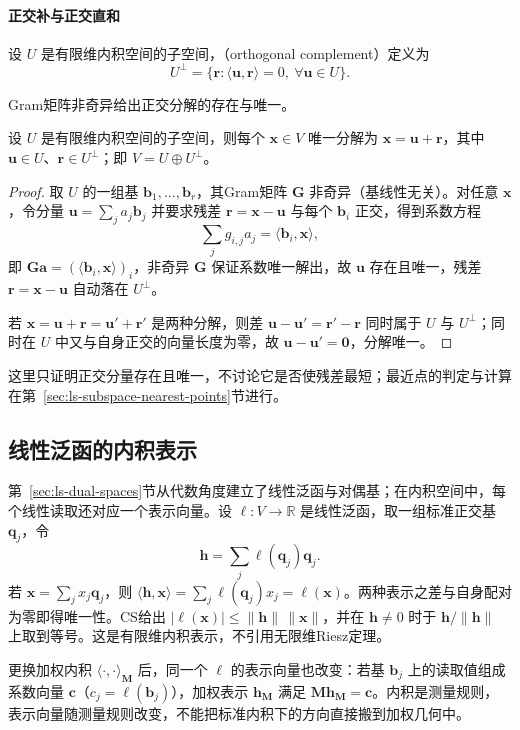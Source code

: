 \paragraph{正交补与正交直和}

设 $U$ 是有限维内积空间的子空间，（orthogonal complement）定义为
\[
 U^\perp=\{\bm r:\langle\bm u,\bm r\rangle=0,\ \forall\bm u\in U\}.
\]

Gram矩阵非奇异给出正交分解的存在与唯一。
\begin{lemma}[正交直和]
\label{lem:ls-orthogonal-decomposition}
设 $U$ 是有限维内积空间的子空间，则每个 $\bm x\in V$ 唯一分解为 $\bm x=\bm u+\bm r$，其中 $\bm u\in U$、$\bm r\in U^\perp$；即 $V=U\oplus U^\perp$。
\end{lemma}
\begin{proof}
取 $U$ 的一组基 $\bm b_1,\ldots,\bm b_r$，其Gram矩阵 $\bm G$ 非奇异（基线性无关）。对任意 $\bm x$，令分量 $\bm u=\sum_j a_j\bm b_j$ 并要求残差 $\bm r=\bm x-\bm u$ 与每个 $\bm b_i$ 正交，得到系数方程
\[
 \sum_j g_{i,j}a_j=\langle\bm b_i,\bm x\rangle,
\]
即 $\bm G\bm a=(\langle\bm b_i,\bm x\rangle)_i$，非奇异 $\bm G$ 保证系数唯一解出，故 $\bm u$ 存在且唯一，残差 $\bm r=\bm x-\bm u$ 自动落在 $U^\perp$。

若 $\bm x=\bm u+\bm r=\bm u'+\bm r'$ 是两种分解，则差 $\bm u-\bm u'=\bm r'-\bm r$ 同时属于 $U$ 与 $U^\perp$；同时在 $U$ 中又与自身正交的向量长度为零，故 $\bm u-\bm u'=\bm0$，分解唯一。
\end{proof}
这里只证明正交分量存在且唯一，不讨论它是否使残差最短；最近点的判定与计算在第~\ref{sec:ls-subspace-nearest-points}节进行。

\subsection{线性泛函的内积表示}
\label{sec:ls-functional-representation}

第~\ref{sec:ls-dual-spaces}节从代数角度建立了线性泛函与对偶基；在内积空间中，每个线性读取还对应一个表示向量。设 $\ell:V\to\mathbb R$ 是线性泛函，取一组标准正交基 $\bm q_j$，令
\[
 \bm h=\sum_j\ell(\bm q_j)\bm q_j.
\]
若 $\bm x=\sum_j x_j\bm q_j$，则 $\langle\bm h,\bm x\rangle=\sum_j\ell(\bm q_j)x_j=\ell(\bm x)$。两种表示之差与自身配对为零即得唯一性。CS给出 $|\ell(\bm x)|\leq\lVert\bm h\rVert\,\lVert\bm x\rVert$，并在 $\bm h\neq0$ 时于 $\bm h/\lVert\bm h\rVert$ 上取到等号。这是有限维内积表示，不引用无限维Riesz定理。

更换加权内积 $\langle\cdot,\cdot\rangle_{\bm M}$ 后，同一个 $\ell$ 的表示向量也改变：若基 $\bm b_j$ 上的读取值组成系数向量 $\bm c$（$c_j=\ell(\bm b_j)$），加权表示 $\bm h_{\bm M}$ 满足 $\bm M\bm h_{\bm M}=\bm c$。内积是测量规则，表示向量随测量规则改变，不能把标准内积下的方向直接搬到加权几何中。

